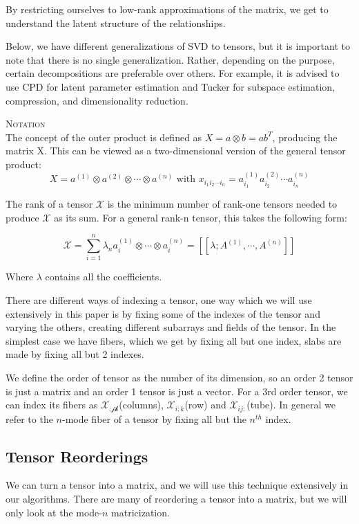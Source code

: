 \documentclass[11pt]{article}
\newcommand\0{\mathbf{0}}
\newcommand\<{\langle}
\renewcommand\>{\rangle}
\begin{document}
By restricting ourselves to low-rank approximations of the matrix, we get to understand the latent structure of the relationships. 

Below, we have different generalizations of SVD to tensors, but it is important to note that there is no single generalization. Rather, depending on the purpose, certain decompositions are preferable over others. For example, it is advised to use CPD for latent parameter estimation and Tucker for subspace estimation, compression, and dimensionality reduction.


\textsc{Notation}\\

The concept of the outer product is defined as $X=a\otimes b=ab^T$, producing the matrix X. This can be viewed as a two-dimensional version of the general tensor product:
$$X=a^{(1)}\otimes a^{(2)}\otimes\cdots\otimes a^{(n)}\text{ with } x_{i_1 i_2 \cdots i_n}=a^{(1)}_{i_1}a^{(2)}_{i_2}\cdots a^{(n)}_{i_n}$$

The rank of a tensor $\mathcal{X}$ is the minimum number of rank-one tensors needed to produce $\mathcal{X}$ as its sum. For a general rank-n tensor, this takes the following form:

$$\mathcal{X}=\sum_{i=1}^n \lambda_n a_i^{(1)} \otimes \cdots \otimes a_i^{(n)}=[[\lambda;A^{(1)},\cdots,A^{(n)}]]$$
    
Where $\lambda$ contains all the coefficients.

There are different ways of indexing a tensor, one way which we will use extensively in this paper is by fixing some of the indexes of the tensor and varying the others, creating different subarrays and fields of the tensor. In the simplest case we have fibers, which we get by fixing all but one index, slabs are made by fixing all but 2 indexes.

We define the order of tensor as the number of its dimension, so an order 2 tensor is just a matrix and an order 1 tensor is just a vector. For a 3rd order tensor, we can index its fibers as $\mathcal{X_{\text{:jk}}}$(columns), $\mathcal{X}_{i:k}$(row) and $\mathcal{X}_{ij:}$(tube). In general we refer to the $n$-mode fiber of a tensor by fixing all but the $n^{th}$ index.

\subsection{Tensor Reorderings}

We can turn a tensor into a matrix, and we will use this technique extensively in our algorithms.
There are many of reordering a tensor into a matrix, but we will only look at the mode-$n$ matricization.
\end{document}
